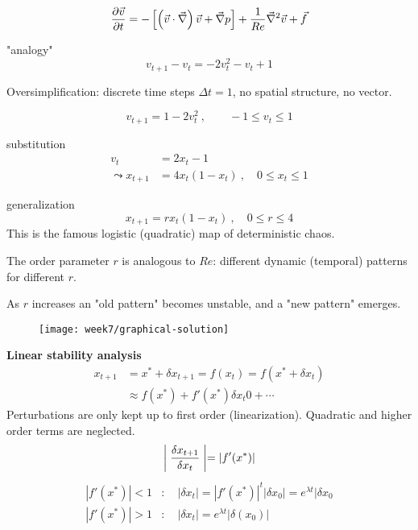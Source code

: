 \begin{equation}
\frac{\partial \vec{v}}{\partial t} = -\left[\left(\vec{v}\cdot\vec{\nabla}\right)\vec{v}+\vec{\nabla}p\right]+\frac{1}{Re}\vec{\nabla}^2\vec{v} + \vec{f}
\end{equation}

"analogy"
\begin{equation}
v_{t+1} - v_t = -2v_t^2 - v_t + 1
\end{equation}

Oversimplification: discrete time steps $\Delta t=1$, no spatial structure, no vector.

\begin{equation}
v_{t+1}=1-2v_t^2\ ,\qquad -1\leq v_t\leq1
\end{equation}

substitution
\begin{align}
v_t&=2x_t-1\\
\leadsto
x_{t+1}&=4x_t(1-x_t)\ ,\quad 0\leq x_t\leq 1
\end{align}

generalization
\begin{equation}
x_{t+1}=rx_t(1-x_t)\ ,\quad 0\leq r\leq 4
\end{equation}
This is the famous logistic (quadratic) map of deterministic chaos.

The order parameter $r$ is analogous to $Re$: different dynamic (temporal) patterns for different $r$.

As $r$ increases an "old pattern" becomes unstable, and a "new pattern" emerges.

\begin{figure}[h]
    \centering
    \texttt{[image: week7/graphical-solution]}\\
    \caption{}
    \label{fig:graphical-solution}
\end{figure}

\begin{framed}
\textbf{Linear stability analysis}
\begin{align}
x_{t+1}&=x^*+\delta x_{t+1} = f(x_t)=f(x^*+\delta x_t)\\
&\approx f(x^*) + f'(x^*)\delta x_t 0 + \cdots
\end{align}
Perturbations are only kept up to first order (linearization). Quadratic and higher order terms are neglected.
\begin{equation}
\biggm\vert\frac{\delta x_{t+1}}{\delta x_{t}}\biggm\vert=|f'(x^*)|
\end{equation}
\begin{align}
|f'(x^*)|<1&:\quad |\delta x_t|=|f'(x^*)|^t|\delta x_0|=e^{\lambda t}|\delta x_0 \\
|f'(x^*)|>1&:\quad  |\delta x_t|=e^{\lambda t}|\delta(x_0)|
\end{align}
\end{framed}


